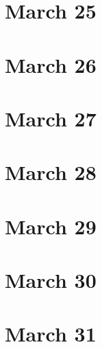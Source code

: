 \section{March 25}

\section{March 26}

\section{March 27}

\section{March 28}

\section{March 29}

\section{March 30}

\section{March 31}

